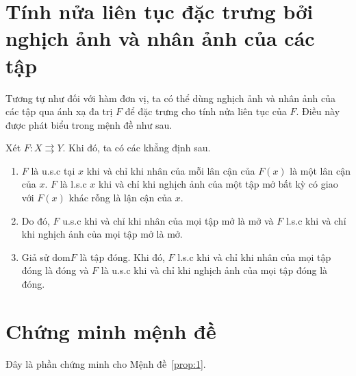 \documentclass{article}
\begin{document}
\section{Tính nửa liên tục đặc trưng bởi nghịch ảnh và nhân ảnh của các tập}

Tương tự như đối với hàm đơn vị, ta có thể dùng nghịch ảnh và nhân ảnh của các tập qua ánh xạ đa trị $F$ để đặc trưng cho tính nửa liên tục của $F$. Điều này được phát biểu trong mệnh đề như sau.

\begin{proposition}
    \label{prop:1}
    Xét $F: X\rightrightarrows Y$. Khi đó, ta có các khẳng định sau.
    \begin{enumerate}[label=(\roman*)]
        \item $F$ là u.s.c tại $x$ khi và chỉ khi nhân của mỗi lân cận của $F(x)$ là một lân cận của $x$. $F$ là l.s.c $x$ khi và chỉ khi nghịch ảnh của một tập mở bất kỳ có giao với $F(x)$ khác rỗng là lận cận của $x$.
        \item Do đó, $F$ u.s.c khi và chỉ khi nhân của mọi tập mở là mở và $F$ l.s.c khi và chỉ khi nghịch ảnh của mọi tập mở là mở.
        \item Giả sử $\text{dom}F$ là tập đóng. Khi đó, $F$ l.s.c khi và chỉ khi nhân của mọi tập đóng là đóng và $F$ là u.s.c khi và chỉ khi nghịch ảnh của mọi tập đóng là đóng.
    \end{enumerate}
\end{proposition}


\section{Chứng minh mệnh đề}

Đây là phần chứng minh cho Mệnh đề~\ref{prop:1}.
\end{document}
